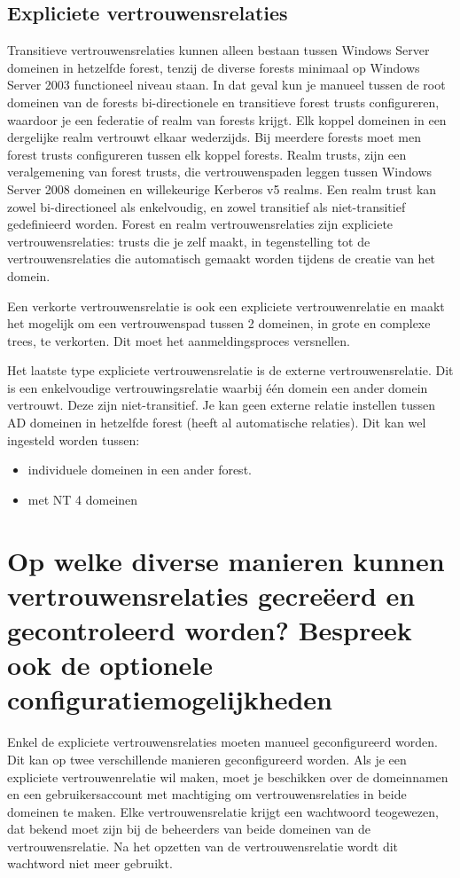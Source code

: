 \subsection{Expliciete vertrouwensrelaties}

Transitieve vertrouwensrelaties kunnen alleen bestaan tussen Windows Server
domeinen in hetzelfde forest, tenzij de diverse forests minimaal op Windows
Server 2003 functioneel niveau staan. In dat geval kun je manueel tussen de root
domeinen van de forests bi-directionele en transitieve forest trusts
configureren, waardoor je een federatie of realm van forests krijgt. Elk koppel
domeinen in een dergelijke realm vertrouwt elkaar wederzijds. Bij meerdere
forests moet men forest trusts configureren tussen elk koppel forests.
Realm trusts, zijn een veralgemening van forest trusts, die vertrouwenspaden
leggen tussen Windows Server 2008 domeinen en willekeurige Kerberos v5 realms.
Een realm trust kan zowel bi-directioneel als enkelvoudig, en zowel transitief
als niet-transitief gedefinieerd worden.
Forest en realm vertrouwensrelaties zijn expliciete vertrouwensrelaties: trusts
die je zelf maakt, in tegenstelling tot de vertrouwensrelaties die automatisch
gemaakt worden tijdens de creatie van het domein.

Een verkorte vertrouwensrelatie is ook een expliciete vertrouwenrelatie en
maakt het mogelijk om een vertrouwenspad tussen 2 domeinen, in grote en complexe
trees, te verkorten. Dit moet het aanmeldingsproces versnellen.

Het laatste type expliciete vertrouwensrelatie is de externe vertrouwensrelatie.
Dit is een enkelvoudige vertrouwingsrelatie waarbij één domein een ander domein
vertrouwt. Deze zijn niet-transitief. Je kan geen externe relatie instellen
tussen AD domeinen in hetzelfde forest (heeft al automatische relaties). Dit kan
wel ingesteld worden tussen:
\begin{itemize}
	\item individuele domeinen in een ander forest.
	\item met NT 4 domeinen
\end{itemize}

\section{Op welke diverse manieren kunnen vertrouwensrelaties gecreëerd en
gecontroleerd worden? Bespreek ook de optionele configuratiemogelijkheden}

Enkel de expliciete vertrouwensrelaties moeten manueel geconfigureerd worden.
Dit kan op twee verschillende manieren geconfigureerd worden. Als je een
expliciete vertrouwenrelatie wil maken, moet je beschikken over de domeinnamen
en een gebruikersaccount met machtiging om vertrouwensrelaties in beide domeinen
te maken. Elke vertrouwensrelatie krijgt een wachtwoord teogewezen, dat bekend
moet zijn bij de beheerders van beide domeinen van de vertrouwensrelatie. Na het
opzetten van de vertrouwensrelatie wordt dit wachtword niet meer gebruikt.

